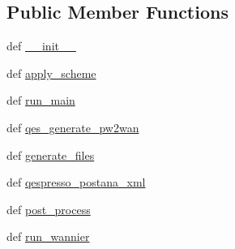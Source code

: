 \subsection*{Public Member Functions}
\begin{DoxyCompactItemize}
\item 
def \hyperlink{class_d_f_t___k_i_t_1_1calculator_1_1_q_e_s_p_r_e_s_s_o_1_1calculator___q_e_s_p_r_e_s_s_o_a1e7a766f5475fb690e82742f8c89378e}{\+\_\+\+\_\+init\+\_\+\+\_\+}
\item 
def \hyperlink{class_d_f_t___k_i_t_1_1calculator_1_1_q_e_s_p_r_e_s_s_o_1_1calculator___q_e_s_p_r_e_s_s_o_a6763d0e90887ebb2b733e12fa8a59b1b}{apply\+\_\+scheme}
\item 
def \hyperlink{class_d_f_t___k_i_t_1_1calculator_1_1_q_e_s_p_r_e_s_s_o_1_1calculator___q_e_s_p_r_e_s_s_o_a169a6c16b4b558ad46353a670ebedd09}{run\+\_\+main}
\item 
def \hyperlink{class_d_f_t___k_i_t_1_1calculator_1_1_q_e_s_p_r_e_s_s_o_1_1calculator___q_e_s_p_r_e_s_s_o_abc5b0dc259dd3413a21b3ba51177bd6a}{qes\+\_\+generate\+\_\+pw2wan}
\item 
def \hyperlink{class_d_f_t___k_i_t_1_1calculator_1_1_q_e_s_p_r_e_s_s_o_1_1calculator___q_e_s_p_r_e_s_s_o_adab77a2703ca8c426b3be4113aaa9ce1}{generate\+\_\+files}
\item 
def \hyperlink{class_d_f_t___k_i_t_1_1calculator_1_1_q_e_s_p_r_e_s_s_o_1_1calculator___q_e_s_p_r_e_s_s_o_a40d5c29ed317a18929aab003f1886d47}{qespresso\+\_\+postana\+\_\+xml}
\item 
def \hyperlink{class_d_f_t___k_i_t_1_1calculator_1_1_q_e_s_p_r_e_s_s_o_1_1calculator___q_e_s_p_r_e_s_s_o_a44775813eb4e7b124720d93f9ec092a8}{post\+\_\+process}
\item 
def \hyperlink{class_d_f_t___k_i_t_1_1calculator_1_1_q_e_s_p_r_e_s_s_o_1_1calculator___q_e_s_p_r_e_s_s_o_a67b1814269d3ededf07dbd0516647d2b}{run\+\_\+wannier}
\end{DoxyCompactItemize}
